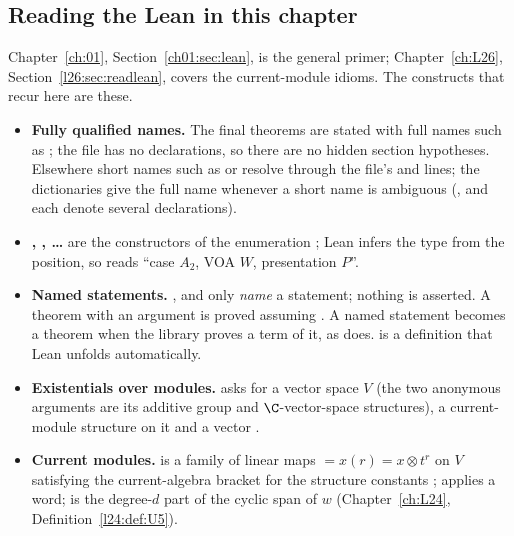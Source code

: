 \subsection{Reading the Lean in this chapter}\label{l27:sec:readlean}

Chapter~\ref{ch:01}, Section~\ref{ch01:sec:lean}, is the general primer; Chapter~\ref{ch:L26},
Section~\ref{l26:sec:readlean}, covers the current-module idioms. The constructs that recur here are these.
\begin{itemize}
\item \textbf{Fully qualified names.} The final theorems are stated with full names such as
  ; the file  has no 
  declarations, so there are no hidden section hypotheses. Elsewhere short names such as  or
   resolve through the file's  and  lines; the dictionaries give the
  full name whenever a short name is ambiguous (,  and
   each denote several declarations).
\item \textbf{, , \dots} are the constructors of the enumeration ; Lean
  infers the type from the position, so  reads ``case $A_2$, VOA $W$, presentation $P$''.
\item \textbf{Named statements.} ,  and 
  only \emph{name} a statement; nothing is asserted. A theorem with an argument  is proved assuming
  . A named statement becomes a theorem when the library proves a term of it, as
   does.  is a definition that Lean unfolds
  automatically.
\item \textbf{Existentials over modules.}  asks
  for a vector space $V$ (the two anonymous arguments \lean{_} are its additive group and $\C$-vector-space structures), a
  current-module structure  on it and a vector .
\item \textbf{Current modules.}  is a family of linear maps $=x(r)=x\otimes t^r$ on $V$
  satisfying the current-algebra bracket for the structure constants ;  applies a word;
   is the degree-$d$ part of the cyclic span of $w$ (Chapter~\ref{ch:L24}, Definition~\ref{l24:def:U5}).

\end{itemize}
